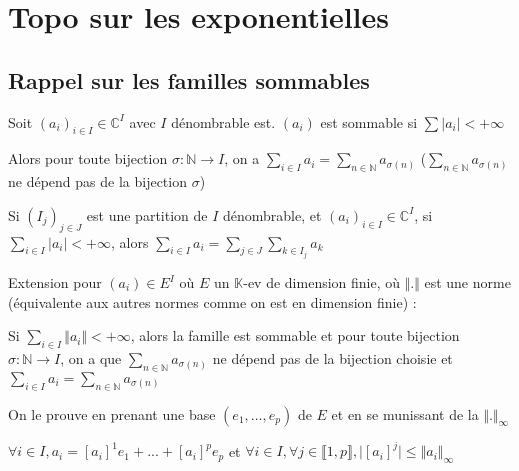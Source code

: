 \documentclass[a4paper,12pt]{book}
\def\C{\mathbb{C}}
\def\N{\mathbb{N}}
\def\K{\mathbb{K}}
\begin{document}
\section{Topo sur les exponentielles}
\subsection{Rappel sur les familles sommables}
Soit $(a_i)_{i\in I}\in \C^I$ avec $I$ dénombrable est. $(a_i)$ est sommable si $\sum\vert a_i\vert < +\infty$
\par Alors pour toute bijection $\sigma:\N\to I$, on a $\sum\limits_{i\in I} a_i = \sum\limits_{n\in\N}a_{\sigma(n)}$ ($\sum\limits_{n\in\N} a_{\sigma(n)}$ ne dépend pas de la bijection $\sigma$)
\par Si $(I_j)_{j\in J}$ est une partition de $I$ dénombrable, et $(a_i)_{i\in I}\in \C^I$, si $\sum\limits_{i\in I}\vert a_i\vert<+\infty$, alors $\sum\limits_{i\in I} a_i = \sum\limits_{j\in J}\sum\limits_{k\in I_j} a_k$
\par Extension pour $(a_i)\in E^I$ où $E$ un $\K$-ev de dimension finie, où $\Vert.\Vert$ est une norme (équivalente aux autres normes comme on est en dimension finie) :
\par Si $\sum\limits_{i\in I}\Vert a_i\Vert<+\infty$, alors la famille est sommable et pour toute bijection $\sigma:\N\to I$, on a que $\sum\limits_{n\in\N}a_{\sigma(n)}$ ne dépend pas de la bijection choisie et $\sum\limits_{i\in I} a_i = \sum\limits_{n\in\N}a_{\sigma(n)}$
\par On le prouve en prenant une base $(e_1,..., e_p)$ de $E$ et en se munissant de la $\Vert.\Vert_{\infty}$
\par $\forall i\in I, a_i = [a_i]^1e_1+...+[a_i]^pe_p$ et $\forall i\in I, \forall j\in\llbracket 1, p\rrbracket, \vert [a_i]^j\vert\leq \Vert a_i\Vert_\infty$
\end{document}
